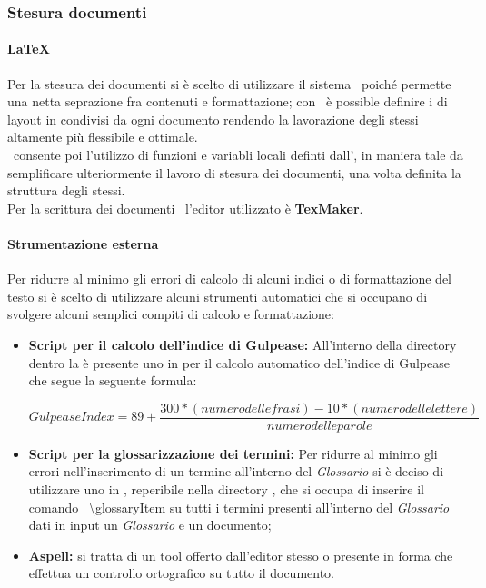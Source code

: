     \subsubsection{Stesura documenti}
      \paragraph{\LaTeX}
        Per la stesura dei documenti si è scelto di utilizzare il sistema \glossaryItem{\LaTeX}\ poiché permette una netta seprazione fra contenuti
        e formattazione; con \glossaryItem{\LaTeX}\ è possible definire i  di layout in  condivisi da ogni documento rendendo la lavorazione
        degli stessi altamente più flessibile e ottimale.\\
        \glossaryItem{\LaTeX}\ consente poi l'utilizzo di funzioni e variabli locali definti dall', in maniera tale da semplificare ulteriormente
        il lavoro di stesura dei documenti, una volta definita la struttura degli stessi.\\
        Per la scrittura dei documenti \glossaryItem{\LaTeX}\ l'editor utilizzato è \textbf{TexMaker}.
      \paragraph{Strumentazione esterna}
        Per ridurre al minimo gli errori di calcolo di alcuni indici o di formattazione del testo si è scelto di utilizzare alcuni strumenti
        automatici che si occupano di svolgere alcuni semplici compiti di calcolo e formattazione:
        \begin{itemize}
          \item \textbf{Script  per il calcolo dell'indice di Gulpease: }All'interno della directory  dentro la  è presente
          uno  in  per il calcolo automatico dell'indice di Gulpease che segue la seguente formula:
          \begin{center}
            \begin{equation}
              Gulpease Index = 89+\frac{300*( numero delle frasi ) - 10*( numero delle lettere )}{numero delle parole}
            \end{equation}
          \end{center}
          \item \textbf{Script  per la glossarizzazione dei termini: }Per ridurre al minimo gli errori nell'inserimento di un termine all'interno
          del \emph{Glossario} si è deciso di utilizzare uno  in , reperibile nella directory , che si occupa di inserire
          il comando \glossaryItem{\LaTeX}\ \textbackslash glossaryItem{} su tutti i termini presenti all'interno del \emph{Glossario} dati in input un \emph{Glossario}
          e un documento;
          \item \textbf{Aspell: }si tratta di un tool offerto dall'editor stesso o presente in forma  che effettua un controllo ortografico
          su tutto il documento.
        \end{itemize}
